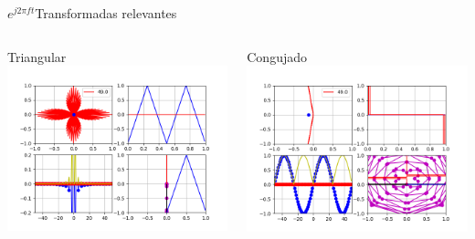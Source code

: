 \begin{frame}{$e^{j2\pi ft}$}{Transformadas relevantes}
   \begin{columns}[c]
      \begin{column}{.5\textwidth}
         Triangular
         \centering\includegraphics[width=1.0\textwidth]{3_clase/euler_triangular}
      \end{column}
      \begin{column}{.5\textwidth}
         Congujado
         \centering\includegraphics[width=1.0\textwidth]{3_clase/euler_conjugado}
      \end{column}
   \end{columns}
   \vfill
\end{frame}
